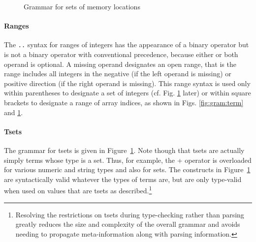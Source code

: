 \begin{figure}[htp]
  \begin{cadre}
      
    \end{cadre}
  \caption{Grammar for sets of memory locations}
\label{fig:gram:locations}
\end{figure}

\paragraph{Ranges}
The \lstinline|..| syntax for ranges of integers has the appearance of a
binary operator but is not a binary operator with conventional precedence,
because either or both operand is optional.
A missing operand designates an
open range, that is the range includes all integers in the negative (if the left operand is missing) or positive direction (if the right operand is missing).
This range syntax is used only within parentheses to designate a set of
integers (cf. Fig. \ref{fig:gram:locations} later) or within square brackets to designate a
range of array indices, as shown in Figs.  \ref{fig:gram:term} and
\ref{fig:gram:locations}.

\paragraph{Tsets}
The grammar for tsets is given in
Figure~\ref{fig:gram:locations}.
Note though that tsets are actually simply terms whose type is a set. Thus, for example, the + operator is overloaded for various numeric and string types and also for sets.
The constructs in Figure~\ref{fig:gram:locations} are syntactically valid whatever the types of terms are, but are only type-valid when used on values that are tsets as described.\footnote{Resolving the restrictions on tsets during type-checking rather than parsing greatly reduces the size and complexity of the overall grammar and avoids needing to
propagate meta-information along with parsing information.}

